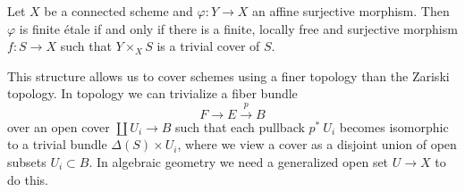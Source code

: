 \begin{theorem}
	\label{locallyTrivial}
	Let $X$ be a connected scheme and $\varphi : Y \to X$ an affine surjective morphism. Then $\varphi$ is finite \'etale if and only if there is a finite, locally free and surjective morphism $f: S \to X$ such that $Y \times_X S$ is a trivial cover of $S$.
\end{theorem}

\begin{remark}
	This structure allows us to cover schemes using a finer topology than the Zariski topology. In topology we can trivialize a fiber bundle
	\[
		F \to E \stackrel{p}{\to} B
	\]
	over an open cover $\coprod U_i \to B$ such that each pullback $p^*\ U_i $ becomes isomorphic to a trivial bundle $\Delta(S) \times U_i$, where we view a cover as a disjoint union of open subsets $U_i \subset B$. In algebraic geometry we need a generalized open set $U \to X$ to do this.
\end{remark}

